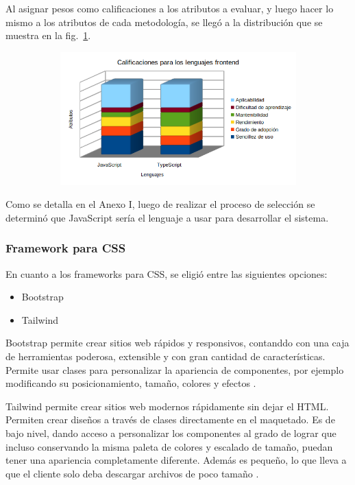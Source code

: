 \documentclass{article}
\begin{document}
Al asignar pesos como calificaciones a los atributos a evaluar, y luego hacer lo mismo a los atributos de cada metodología, se llegó a la distribución que se muestra en la fig.~\ref{fig:lenguajesFrontend}.
\begin{figure}[H]
	\caption{Calificaciones para lenguajes frontend}
    \begin{subfigure}{1\textwidth}
	\includegraphics[width=1\textwidth]{calificaciones para lenguajes frontend.png}
    \end{subfigure}
	\label{fig:lenguajesFrontend}
\end{figure}
\vspace{-1.0\baselineskip}
Como se detalla en el Anexo I, luego de realizar el proceso de selección se determinó que JavaScript sería el lenguaje a usar para desarrollar el sistema.
\subsubsection{Framework para CSS}
En cuanto a los frameworks para CSS, se eligió entre las siguientes opciones:
\begin{itemize}
    \item Bootstrap
    \item Tailwind
\end{itemize}

Bootstrap permite crear sitios web rápidos y responsivos, contanddo con una caja de herramientas poderosa, extensible y con gran cantidad de características. Permite usar clases para personalizar la apariencia de componentes, por ejemplo modificando su posicionamiento, tamaño, colores y efectos \parencite{bootstrapOfficial}.

Tailwind permite crear sitios web modernos rápidamente sin dejar el HTML. Permiten crear diseños a través de clases directamente en el maquetado. Es de bajo nivel, dando acceso a personalizar los componentes al grado de lograr que incluso conservando la misma paleta de colores y escalado de tamaño, puedan tener una apariencia completamente diferente. Además es pequeño, lo que lleva a que el cliente solo deba descargar archivos de poco tamaño \parencite{tailwindOfficial}.
\end{document}
